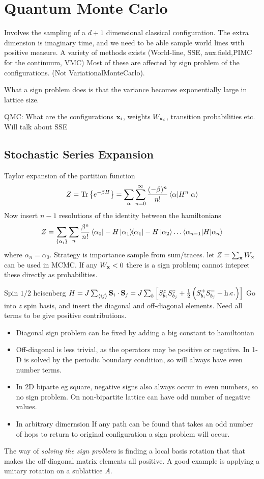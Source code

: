 \documentclass[a4paper]{article}
\begin{document}
\section{Quantum Monte Carlo}
Involves the sampling of a $d+1$ dimensional classical configuration. The extra
dimension is imaginary time, and we need to be able sample world lines with
positive measure. A variety of methods exists (World-line, SSE, aux.field,PIMC
for the continuum, VMC)
Most of these are affected by sign problem of the configurations.
(Not VariationalMonteCarlo).

What a sign problem does is that the variance becomes exponentially large in
lattice size.

QMC: What are the configurations $\mathbf x_i$, weights $W_{\mathbf x_i}$, transition
probabilities etc.
Will talk about  SSE
\subsection{Stochastic Series Expansion}
Taylor expansion of the partition function
\[ Z=\operatorname{Tr} \left\{ e^{-\beta H}\right\}=\sum_\alpha\sum_{n=0}^\infty
\frac{(-\beta)^n}{n!}\braket{\alpha|H^n|\alpha}\]
Now insert $n-1$ resolutions of the identity between the hamiltonians
\[
    Z=\sum_{\{\alpha_i\}}\sum_n \frac{\beta^n}{n!}
    \bra{\alpha_0}-H\ket{\alpha_1}\!\!\bra{\alpha_1}-H\ket{\alpha_2}\dots
\braket{\alpha_{n-1}|H|\alpha_n}\]
where $\alpha_n=\alpha_0$.
Strategy is importance sample from sum/traces. let $Z=\sum_\mathbf x W_{\mathbf x}$ can
be used in MCMC. If any $W_\mathbf x <0$ there is a sign problem; cannot intepret
these directly as probabilities.
\begin{example}
Spin $1/2$ heisenberg $H=J\sum_{\braket{ij} }\mathbf {S}_i\cdot \mathbf {S}_j=J\sum_b
    \left[  S_{b_i}^z S_{b_j}^z+\frac12
    \left(S^+_{b_i}S^-_{b_j}+\mathrm{h.c.}\right)\right]$
Go into $z$ spin basis, and insert the diagonal and off-diagonal elements. Need
all terms to be give positive contributions.
\begin{itemize}
    \item Diagonal sign problem can be fixed by adding a big constant to
        hamiltonian
    \item Off-diagonal is less trivial, as the operators may be positive or
        negative. In 1-D is solved by the periodic boundary condition, so will
        always have even number terms.
    \item In 2D biparte eg square, negative signs also always occur in even numbers, so
        no sign problem. On non-bipartite lattice can have odd number of
        negative values.
    \item In arbitrary dimernsion If any path can be found that takes an odd
        number of hops to return to original configuration a sign problem will
        occur.
\end{itemize}
The way of \emph{solving the sign problem} is finding a local basis rotation
that that makes the off-diagonal matrix elements all positive.
A good example is applying a unitary rotation on a sublattice $A$.
\end{example}
\end{document}
